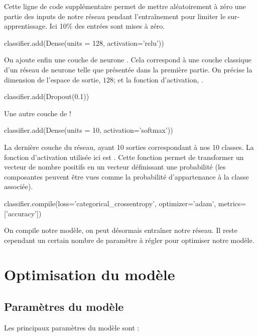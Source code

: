 Cette ligne de code supplémentaire permet de mettre aléatoirement à zéro une partie des 
inputs de notre réseau pendant l'entraînement pour limiter le sur-apprentissage. Ici 10\%
des entrées sont mises à zéro.

\begin{codeblock}
classifier.add(Dense(units = 128, activation='relu'))
\end{codeblock}

On ajoute enfin une couche de neurone . 
Cela correspond à une couche classique d'un réseau de neurone telle que présentée 
dans la première partie. 
On précise la dimension de l'espace de sortie, $128$; et la fonction 
d'activation, . 

\begin{codeblock}
classifier.add(Dropout(0.1)) 
\end{codeblock}

Une autre couche de  !


\begin{codeblock}
classifier.add(Dense(units = 10, activation='softmax'))
\end{codeblock}

La dernière couche du réseau, ayant 10 sorties correspondant à nos 10 classes. 
La fonction d'activation utilisée ici est . 
Cette fonction permet de transformer un vecteur de nombre positifs en 
un vecteur définissant une probabilité (les composantes peuvent être 
vues comme la probabilité d'appartenance à la classe associée).
    
	
\begin{codeblock}
classifier.compile(loss='categorical_crossentropy', optimizer='adam', metrics=['accuracy'])
\end{codeblock}

On compile notre modèle, on peut désormais entraîner notre réseau. 
Il reste cependant un certain nombre de paramètre à régler pour optimiser notre modèle.

\section{Optimisation du modèle}

\subsection{Paramètres du modèle}

Les principaux paramètres du modèle sont :


